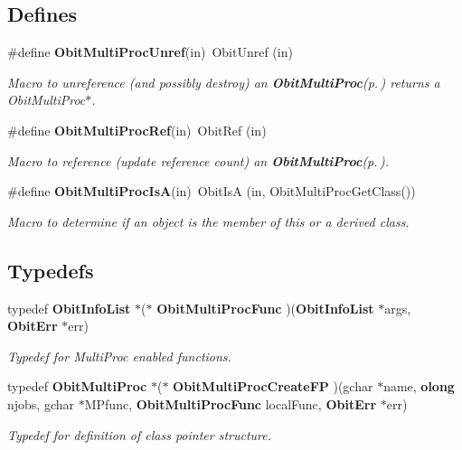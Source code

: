 \subsection*{Defines}
\begin{CompactItemize}
\item 
\#define {\bf Obit\-Multi\-Proc\-Unref}(in)\ Obit\-Unref (in)
\begin{CompactList}\small\item\em Macro to unreference (and possibly destroy) an {\bf Obit\-Multi\-Proc}{\rm (p.\,\pageref{structObitMultiProc})} returns a Obit\-Multi\-Proc$\ast$. \item\end{CompactList}\item 
\#define {\bf Obit\-Multi\-Proc\-Ref}(in)\ Obit\-Ref (in)
\begin{CompactList}\small\item\em Macro to reference (update reference count) an {\bf Obit\-Multi\-Proc}{\rm (p.\,\pageref{structObitMultiProc})}. \item\end{CompactList}\item 
\#define {\bf Obit\-Multi\-Proc\-Is\-A}(in)\ Obit\-Is\-A (in, Obit\-Multi\-Proc\-Get\-Class())
\begin{CompactList}\small\item\em Macro to determine if an object is the member of this or a derived class. \item\end{CompactList}\end{CompactItemize}
\subsection*{Typedefs}
\begin{CompactItemize}
\item 
typedef {\bf Obit\-Info\-List} $\ast$($\ast$ {\bf Obit\-Multi\-Proc\-Func} )({\bf Obit\-Info\-List} $\ast$args, {\bf Obit\-Err} $\ast$err)
\begin{CompactList}\small\item\em Typedef for Multi\-Proc enabled functions. \item\end{CompactList}\item 
typedef {\bf Obit\-Multi\-Proc} $\ast$($\ast$ {\bf Obit\-Multi\-Proc\-Create\-FP} )(gchar $\ast$name, {\bf olong} njobs, gchar $\ast$MPfunc, {\bf Obit\-Multi\-Proc\-Func} local\-Func, {\bf Obit\-Err} $\ast$err)
\begin{CompactList}\small\item\em Typedef for definition of class pointer structure. \item\end{CompactList}\end{CompactItemize}
